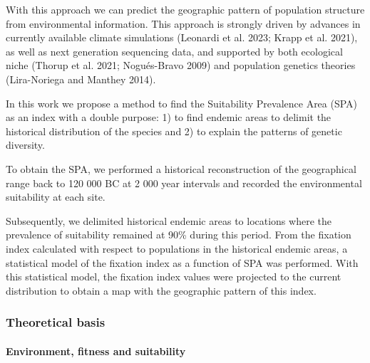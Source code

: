 \documentclass[
]{article}
\begin{document}
With this approach we can predict the geographic pattern of population
structure from environmental information. This approach is strongly
driven by advances in currently available climate simulations (Leonardi
et al. 2023; Krapp et al. 2021), as well as next generation sequencing
data, and supported by both ecological niche (Thorup et al. 2021;
Nogués-Bravo 2009) and population genetics theories (Lira-Noriega and
Manthey 2014).

In this work we propose a method to find the Suitability Prevalence Area
(SPA) as an index with a double purpose: 1) to find endemic areas to
delimit the historical distribution of the species and 2) to explain the
patterns of genetic diversity.

To obtain the SPA, we performed a historical reconstruction of the
geographical range back to 120 000 BC at 2 000 year intervals and
recorded the environmental suitability at each site.

Subsequently, we delimited historical endemic areas to locations where
the prevalence of suitability remained at 90\% during this period. From
the fixation index calculated with respect to populations in the
historical endemic areas, a statistical model of the fixation index as a
function of SPA was performed. With this statistical model, the fixation
index values were projected to the current distribution to obtain a map
with the geographic pattern of this index.

\hypertarget{theoretical-basis}{%
\subsubsection{Theoretical basis}\label{theoretical-basis}}

\hypertarget{environment-fitness-and-suitability}{%
\paragraph{Environment, fitness and
suitability}\label{environment-fitness-and-suitability}}
\end{document}

